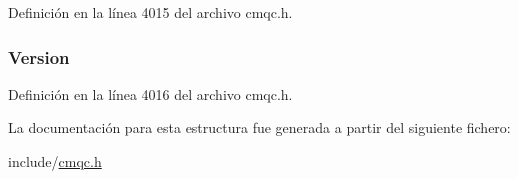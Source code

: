 Definición en la línea 4015 del archivo cmqc.\+h.

\hypertarget{structtag_m_q_s_c_o_a0656ef8f766b3907d394d88a35d7b7e9}{}
\subsubsection[{Version}]{ Version}\label{structtag_m_q_s_c_o_a0656ef8f766b3907d394d88a35d7b7e9}


Definición en la línea 4016 del archivo cmqc.\+h.



La documentación para esta estructura fue generada a partir del siguiente fichero\+:\begin{DoxyCompactItemize}
\item 
include/\hyperlink{cmqc_8h}{cmqc.\+h}\end{DoxyCompactItemize}

